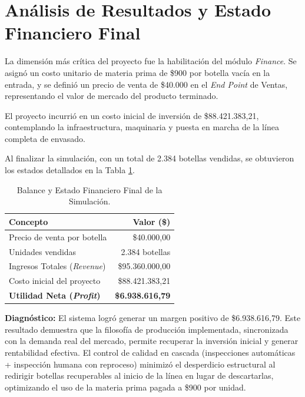\documentclass[12pt, a4paper]{article}
\begin{document}
\section{Análisis de Resultados y Estado Financiero Final}
La dimensión más crítica del proyecto fue la habilitación del módulo \textit{Finance}. Se asignó un costo unitario de materia prima de \$900 por botella vacía en la entrada, y se definió un precio de venta de \$40.000 en el \textit{End Point} de Ventas, representando el valor de mercado del producto terminado.

El proyecto incurrió en un costo inicial de inversión de \$88.421.383,21, contemplando la infraestructura, maquinaria y puesta en marcha de la línea completa de envasado.

Al finalizar la simulación, con un total de 2.384 botellas vendidas, se obtuvieron los estados detallados en la Tabla \ref{tab:financiero}.

\begin{table}[htbp]
    \centering
    \caption{Balance y Estado Financiero Final de la Simulación.}
    \label{tab:financiero}
    \vspace{0.2cm}
    \begin{tabularx}{0.8\textwidth}{X r}
        \toprule
        \textbf{Concepto} & \textbf{Valor (\$)} \\
        \midrule
        Precio de venta por botella & \$40.000,00 \\
        Unidades vendidas & 2.384 botellas \\
        Ingresos Totales (\textit{Revenue}) & \$95.360.000,00 \\
        Costo inicial del proyecto & \$88.421.383,21 \\
        \midrule
        \textbf{Utilidad Neta (\textit{Profit})} & \textbf{\$6.938.616,79} \\
        \bottomrule
    \end{tabularx}
\end{table}

\textbf{Diagnóstico:} El sistema logró generar un margen positivo de \$6.938.616,79. Este resultado demuestra que la filosofía de producción implementada, sincronizada con la demanda real del mercado, permite recuperar la inversión inicial y generar rentabilidad efectiva. El control de calidad en cascada (inspecciones automáticas + inspección humana con reproceso) minimizó el desperdicio estructural al redirigir botellas recuperables al inicio de la línea en lugar de descartarlas, optimizando el uso de la materia prima pagada a \$900 por unidad.
\end{document}
